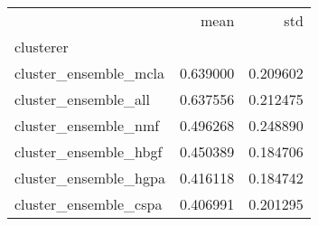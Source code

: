 \begin{tabular}{lrr}
\toprule
{} &      mean &       std \\
clusterer             &           &           \\
\midrule
cluster\_ensemble\_mcla &  0.639000 &  0.209602 \\
cluster\_ensemble\_all  &  0.637556 &  0.212475 \\
cluster\_ensemble\_nmf  &  0.496268 &  0.248890 \\
cluster\_ensemble\_hbgf &  0.450389 &  0.184706 \\
cluster\_ensemble\_hgpa &  0.416118 &  0.184742 \\
cluster\_ensemble\_cspa &  0.406991 &  0.201295 \\
\bottomrule
\end{tabular}

